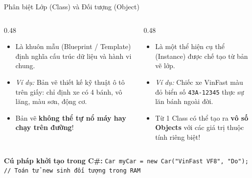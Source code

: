 \documentclass[aspectratio=169, 10pt]{beamer}
\begin{document}
\begin{frame}{Phân biệt Lớp (Class) và Đối tượng (Object)}
  \begin{columns}[c]
    \begin{column}{0.48\textwidth}
      \begin{tcolorbox}[colback=UniNavy!5,colframe=UniNavy,title=\textbf{Lớp (Class) = Bản vẽ thiết kế}]
        \begin{itemize}
          \item Là khuôn mẫu (Blueprint / Template) định nghĩa cấu trúc dữ liệu và hành vi chung.
          \item \textit{Ví dụ:} Bản vẽ thiết kế kỹ thuật ô tô trên giấy: chỉ định xe có 4 bánh, vô lăng, màu sơn, động cơ.
          \item Bản vẽ \textbf{không thể tự nổ máy hay chạy trên đường}!
        \end{itemize}
      \end{tcolorbox}
    \end{column}
    \begin{column}{0.48\textwidth}
      \begin{tcolorbox}[colback=UniGreen!5,colframe=UniGreen,title=\textbf{Đối tượng (Object) = Thực thể cụ thể}]
        \begin{itemize}
          \item Là một thể hiện cụ thể (Instance) được chế tạo từ bản vẽ lớp.
          \item \textit{Ví dụ:} Chiếc xe VinFast màu đỏ biển số \texttt{43A-12345} thực sự lăn bánh ngoài đời.
          \item Từ 1 Class có thể tạo ra \textbf{vô số Objects} với các giá trị thuộc tính riêng biệt!
        \end{itemize}
      \end{tcolorbox}
    \end{column}
  \end{columns}
  \vskip 2mm
  \begin{exampleblock}{\textbf{Cú pháp khởi tạo trong C\#:}}
    \texttt{Car myCar = new Car("VinFast VF8", "Do"); // Toán tử new sinh đối tượng trong RAM}
  \end{exampleblock}
\end{frame}
\end{document}
